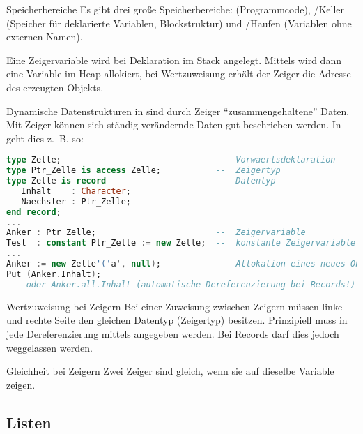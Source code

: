 \begin{Def}{Speicherbereiche}
    Es gibt drei große Speicherbereiche: 
    (Programmcode), /Keller (Speicher für deklarierte Variablen,
    Blockstruktur) und /Haufen (Variablen ohne externen Namen).

    Eine Zeigervariable wird bei Deklaration im Stack angelegt. Mittels
     wird dann eine Variable im Heap allokiert, bei Wertzuweisung
    erhält der Zeiger die Adresse des erzeugten Objekts.
\end{Def}

\begin{Def}{Dynamische Datenstrukturen in \Ada{}}
     sind durch Zeiger
    "`zusammengehaltene"' Daten.
    Mit Zeiger können sich ständig verändernde Daten gut beschrieben werden.
    In \Ada{} geht dies z.~B. so:
\begin{lstlisting}[language=ada]
type Zelle;                               --  Vorwaertsdeklaration
type Ptr_Zelle is access Zelle;           --  Zeigertyp
type Zelle is record                      --  Datentyp
   Inhalt    : Character;
   Naechster : Ptr_Zelle;
end record;
...
Anker : Ptr_Zelle;                        --  Zeigervariable
Test  : constant Ptr_Zelle := new Zelle;  --  konstante Zeigervariable
...
Anker := new Zelle'('a', null);           --  Allokation eines neues Objekts, Nullpointer
Put (Anker.Inhalt);
--  oder Anker.all.Inhalt (automatische Dereferenzierung bei Records!)
\end{lstlisting}
\end{Def}

\begin{Def}{Wertzuweisung bei Zeigern}
    Bei einer Zuweisung zwischen Zeigern müssen linke und rechte Seite den
    gleichen Datentyp (Zeigertyp) besitzen.
    Prinzipiell muss in \Ada{} jede Dereferenzierung mittels 
    angegeben werden.
    Bei Records darf dies jedoch weggelassen werden.
\end{Def}

\begin{Def}{Gleichheit bei Zeigern}
    Zwei Zeiger sind gleich, wenn sie auf dieselbe Variable zeigen.
\end{Def}

\subsection{%
    Listen%
}

